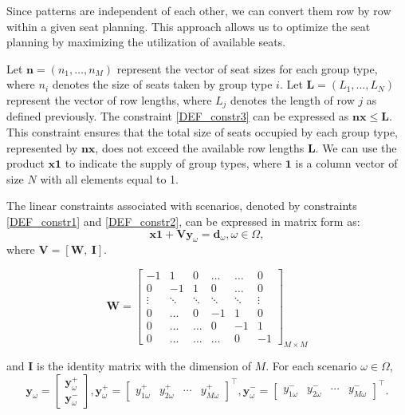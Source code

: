 Since patterns are independent of each other, we can convert them row by row within a given seat planning. This approach allows us to optimize the seat planning by maximizing the utilization of available seats.

Let $\mathbf{n} = (n_1, \ldots, n_M)$ represent the vector of seat sizes for each group type, where $n_i$ denotes the size of seats taken by group type $i$. Let $\mathbf{L} = (L_1, \ldots, L_N)$ represent the vector of row lengths, where $L_j$ denotes the length of row $j$ as defined previously.
The constraint \eqref{DEF_constr3} can be expressed as $\mathbf{n} \mathbf{x} \leq \mathbf{L}$. This constraint ensures that the total size of seats occupied by each group type, represented by $\mathbf{n} \mathbf{x}$, does not exceed the available row lengths $\mathbf{L}$. We can use the product $\mathbf{x} \mathbf{1}$ to indicate the supply of group types, where $\mathbf{1}$ is a column vector of size $N$ with all elements equal to 1. 

The linear constraints associated with scenarios, denoted by constraints \eqref{DEF_constr1} and \eqref{DEF_constr2}, can be expressed in matrix form as:
\[\mathbf{x} \mathbf{1} + \mathbf{V} \mathbf{y}_\omega = \mathbf{d}_\omega, \omega\in \Omega,\]
where $\mathbf{V} = [\mathbf{W}, ~\mathbf{I}]$.

$$
\mathbf{W}=\left[\begin{array}{cccccc}
-1 & 1 & 0 & \ldots & \ldots & 0 \\
0 & -1 & 1 &    0   & \ldots & 0 \\
\vdots & \ddots & \ddots & \ddots & \ddots & \vdots \\
0  & \ldots   &  0  & -1 & 1 & 0 \\
0  & \ldots   &  \ldots  &  0 &  -1 & 1 \\
0 & \ldots & \ldots & \ldots & 0 & -1
\end{array}\right]_{M \times M}
$$

and $\mathbf{I}$ is the identity matrix with the dimension of $M$. For each scenario $\omega \in \Omega$,
$$
\mathbf{y}_{\omega}=\left[\begin{array}{l}
\mathbf{y}_{\omega}^{+} \\
\mathbf{y}_{\omega}^{-}
\end{array}\right], \mathbf{y}_{\omega}^{+}=\left[\begin{array}{lllll}y_{1 \omega}^{+} & y_{2 \omega}^{+} & \cdots & y_{M \omega}^{+}\end{array}\right]^{\intercal}, \mathbf{y}_{\omega}^{-}=\left[\begin{array}{llll}y_{1 \omega}^{-} & y_{2 \omega}^{-} & \cdots & y_{M \omega}^{-}\end{array}\right]^{\intercal}.
$$

